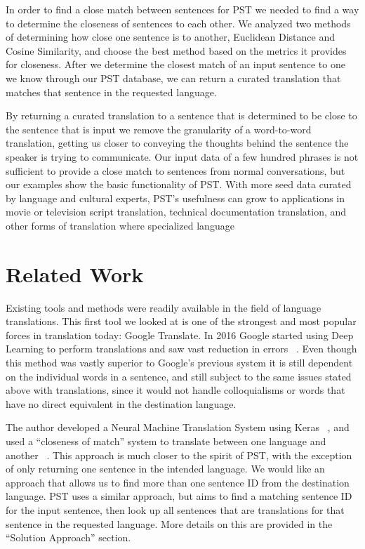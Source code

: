 \documentclass[runningheads]{llncs}
\begin{document}
	In order to find a close match between sentences for PST we needed to find a way to determine the closeness of sentences to each other. We analyzed two  methods of determining how close one sentence is to another, Euclidean Distance and Cosine Similarity, and choose the best method based on the metrics it provides for closeness. After we determine the closest match of an input sentence to one we know through our PST database, we can return a curated translation that matches that sentence in the requested language.

	By returning a curated translation to a sentence that is determined to be close to the sentence that is input we remove the granularity of a word-to-word translation, getting us closer to conveying the thoughts behind the sentence the speaker is trying to communicate. Our input data of a few hundred phrases is not sufficient to provide a close match to sentences from normal conversations, but our examples show the basic functionality of PST. With more seed data curated by language and cultural experts, PST's usefulness can grow to applications in movie or television script translation, technical documentation translation, and other forms of translation where specialized language 
	
	\section{Related Work}
	 Existing tools and methods were readily available in the field of language translations. This first tool we looked at is one of the strongest and most popular forces in translation today: Google Translate. In 2016 Google started using Deep Learning  to perform translations and saw vast reduction in errors ~\cite{ref_url3}. Even though this method was vastly superior to Google's previous system it is still dependent on the individual words in a sentence, and still subject to the same issues stated above with translations, since it would not handle colloquialisms or words that have no direct equivalent in the destination language. 

	The author developed a Neural Machine Translation System using Keras ~\cite{ref_url4}, and used a ``closeness of match'' system to translate between one language and another ~\cite{ref_url5}. This approach is much closer to the spirit of PST, with the exception of only returning one sentence in the intended language. We would like an approach that allows us to find more than one sentence ID from the destination language. PST uses a similar approach, but aims to find a matching sentence ID for the input sentence, then look up all sentences that are translations for that sentence in the requested language. More details on this are provided in the ``Solution Approach'' section.
	
\end{document}
